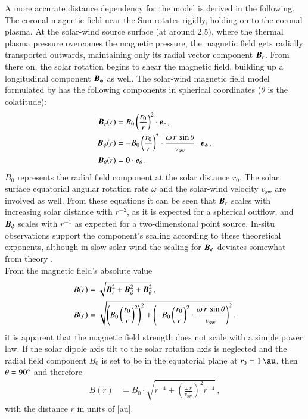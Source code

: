 A more accurate distance dependency for the model is derived in the following.\\

The coronal magnetic field near the Sun rotates rigidly, holding on to the coronal plasma. At the solar-wind source surface (at around \SI{2.5}{\Rs}), where the thermal plasma pressure overcomes the magnetic pressure, the magnetic field gets radially transported outwards, maintaining only its radial vector component $\boldsymbol{B}_r$. From there on, the solar rotation begins to shear the magnetic field, building up a longitudinal component $\boldsymbol{B}_\phi$ as well. The solar-wind magnetic field model formulated by \citet{Parker1958} has the following components in spherical coordinates ($\theta$ is the colatitude):
\begin{align}
	\boldsymbol{B}_r(r) &= B_0 \left(\frac{r_0}{r}\right)^2 \cdot \boldsymbol{e}_r\,,\\
	\boldsymbol{B}_\phi(r) &= -B_0 \left(\frac{r_0}{r}\right)^2 \cdot \frac{\omega\,r\,\sin\theta}{v_\text{sw}} \cdot \boldsymbol{e}_\phi	\,,	\label{eq:b_phi_vector}\\
	\boldsymbol{B}_\theta(r) &= 0 \cdot \boldsymbol{e}_\theta\,.
\end{align}
$B_0$ represents the radial field component at the solar distance $r_0$. The solar surface equatorial angular rotation rate $\omega$ and the solar-wind velocity $v_\text{sw}$ are involved as well. From these equations it can be seen that $\boldsymbol{B}_r$ scales with increasing solar distance with $r^{-2}$, as it is expected for a spherical outflow, and $\boldsymbol{B}_\phi$ scales with $r^{-1}$ as expected for a two-dimensional point source. In-situ observations support the component's scaling according to these theoretical exponents, although in slow solar wind the scaling for $\boldsymbol{B}_\phi$ deviates somewhat from theory \citep{Mariani1978}.\\

From the magnetic field's absolute value
\begin{align}
	B(r) &= \sqrt{\boldsymbol{B}_r^2 + \boldsymbol{B}_\phi^2 + \boldsymbol{B}_\theta^2}\,,	\label{eq:B_absolute}\\
	B(r) &= \sqrt{\left(B_0 \left(\frac{r_0}{r}\right)^2\right)^2 + \left(-B_0 \left(\frac{r_0}{r}\right)^2 \cdot \frac{\omega\,r\,\sin\theta}{v_\text{sw}}\right)^2}\,,
\end{align}
it is apparent that the magnetic field strength does not scale with a simple power law. If the solar dipole axis tilt to the solar rotation axis is neglected and the radial field component $B_0$ is set to be in the equatorial plane at $r_0 = \SI{1}{\au}$, then $\theta = 90\degree$ and therefore
\begin{align}
	B(r) &= B_0 \cdot \sqrt{r^{-4} + \left(\frac{\omega\,r}{v_\text{sw}}\right)^2 r^{-4}}\,,	\label{eq:B_1au}
\end{align}
with the distance $r$ in units of [au].\\

